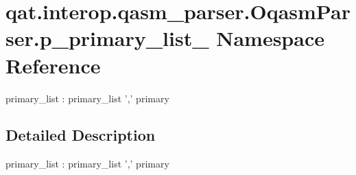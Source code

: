 \hypertarget{namespaceqat_1_1interop_1_1qasm__parser_1_1OqasmParser_1_1p__primary__list__1}{\section{qat.\-interop.\-qasm\-\_\-parser.\-Oqasm\-Parser.\-p\-\_\-primary\-\_\-list\-\_ Namespace Reference}
\label{namespaceqat_1_1interop_1_1qasm__parser_1_1OqasmParser_1_1p__primary__list__1}
}


primary\-\_\-list \-: primary\-\_\-list ',' primary  




\subsection{Detailed Description}
primary\-\_\-list \-: primary\-\_\-list ',' primary 